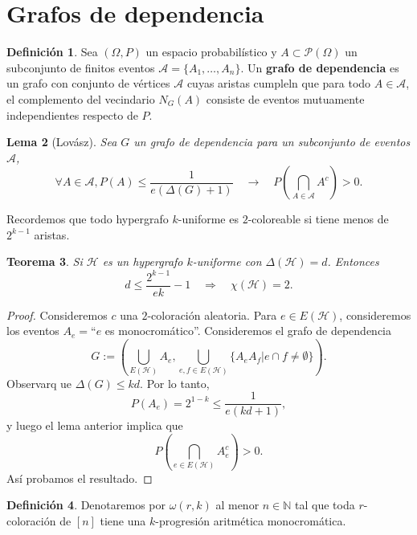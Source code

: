\documentclass[12pt]{report}
\theoremstyle{plain}
\newtheorem{theorem}{Teorema}[section]
\newtheorem{lemma}[theorem]{Lema}
\theoremstyle{definition}
\newtheorem{definition}[theorem]{Definición}
\newcommand{\naturals}{\mathbb{N}}
\begin{document}
\section{Grafos de dependencia}

\begin{definition}
Sea $(\Omega, P)$ un espacio probabilístico y $A \subset \mathcal P (\Omega)$ un subconjunto de finitos eventos $\mathcal A = \{A_1, \ldots, A_n\}$. Un \textbf{grafo de dependencia} es un grafo con conjunto de vértices $\mathcal A$ cuyas aristas cumpleln que para todo $A\in \mathcal A$, el complemento del vecindario $N_G (A)$ consiste de eventos mutuamente independientes respecto de $P$.
\end{definition}

\begin{lemma}[Lovász]\label{lema:lovasz sobre grafo de dependencia}
Sea $G$ un grafo de dependencia para un subconjunto de eventos $\mathcal A$,
\[
    \forall A \in \mathcal A , P(A) \leq \frac{1}{e (\Delta (G) + 1)} \quad \longrightarrow \quad P(\bigcap_{A \in \mathcal A} A^c) > 0.
\]
\end{lemma}

Recordemos que todo hypergrafo $k$-uniforme es $2$-coloreable si tiene menos de $2^{k-1}$ aristas.

\begin{theorem}
Si $\mathcal H$ es un hypergrafo $k$-uniforme con $\Delta (\mathcal H) =d$. Entonces
\[
    d \leq \frac{2^{k-1}}{ek} -1 \quad \Rightarrow \quad \chi (\mathcal H) = 2.
\]
\end{theorem}
\begin{proof}
Consideremos $c$ una $2$-coloración aleatoria. Para $e \in E(\mathcal H)$, consideremos los eventos $A_e = $``$e$ es monocromático''. Consideremos el grafo de dependencia
\[
    G := \left ( \bigcup_{E (\mathcal H)} A_e, \bigcup_{e,f \in E(\mathcal H)} \{ A_e A_f | e \cap f \neq \emptyset \}\right ).
\]
Observarq ue $\Delta (G) \leq kd$. Por lo tanto,
\[
    P(A_e) = 2^{1-k} \leq \frac{1}{e (kd + 1)},
\]
y luego el lema anterior implica que
\[
    P (\bigcap_{e \in E (\mathcal H)} A_e^c) >0.
\]
Así probamos el resultado.
\end{proof}


\begin{definition}
Denotaremos por $\omega (r,k)$ al menor $n \in \naturals$ tal que toda $r$-coloración de $[n]$ tiene una $k$-progresión aritmética monocromática.
\end{definition}
\end{document}
